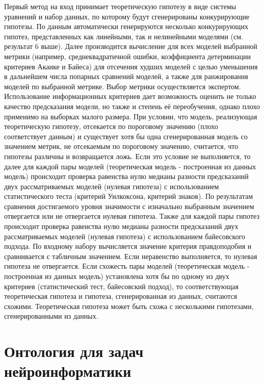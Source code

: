 Первый метод на вход принимает теоретическую гипотезу в виде системы уравнений и набор данных, по которому 
будут сгенерированы конкурирующие гипотезы. По данным автоматически генерируются несколько конкурирующих гипотез, 
представленных как линейными, так и нелинейными моделями (см. результат 6 выше). Далее производится вычисление 
для всех моделей выбранной метрики (например, среднеквадратичной ошибки, коэффициента детерминации критериев 
Акаике и Байеса) для отсечения худших моделей с целью уменьшения в дальнейшем числа попарных сравнений моделей, 
а также для ранжирования моделей по выбранной метрике. Выбор метрики осуществляется экспертом. 
Использование информационных критериев дает возможность оценить не только качество предсказания модели, 
но также и степень её переобучения, однако плохо применимо на выборках малого размера. При условии, что 
модель, реализующая теоретическую гипотезу, отсекается по пороговому значению (плохо соответствует данным) 
и существует хотя бы одна сгенерированная модель со значением метрик, не отсекаемым по пороговому значению, 
считается, что гипотезы различны и возвращается ложь. Если это условие не выполняется, то далее для каждой 
пары моделей (теоретическая модель - построенная из данных модель) происходит проверка равенства нулю медианы 
разности предсказаний двух рассматриваемых моделей (нулевая гипотеза) с использованием статистического теста 
(критерий Уилкоксона, критерий знаков). По результатам сравнения достигаемого уровня значимости с изначально 
выбранным значением отвергается или не отвергается нулевая гипотеза. Также для каждой пары гипотез происходит 
проверка равенства нулю медианы разности предсказаний двух рассматриваемых моделей (нулевая гипотеза) с 
использованием байесовского подхода. По входному набору вычисляется значение критерия правдоподобия и 
сравнивается с табличным значением. Если неравенство выполняется, то нулевая гипотеза не отвергается. 
Если схожесть пары моделей (теоретическая модель - построенная из данных модель) установлена хотя бы по одному из 
двух критериев (статистический тест, байесовский подход), то соответствующая теоретическая гипотеза и гипотеза, 
сгенерированная из данных, считаются схожими. Теоретическая гипотеза может быть схожа с несколькими гипотезами, 
сгенерированными из данных.

\section{Онтология для задач нейроинформатики}\label{sect_5_1}

